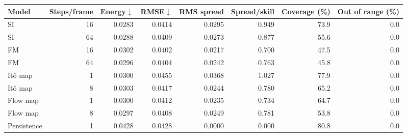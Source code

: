 \begin{tabular}{lrrrrrrr}
\toprule
Model & Steps/frame & Energy$\downarrow$ & RMSE$\downarrow$ & RMS spread & Spread/skill & Coverage (\%) & Out of range (\%) \\
\midrule
SI & 16 & 0.0283 & 0.0414 & 0.0295 & 0.949 & 73.9 & 0.0 \\
SI & 64 & 0.0288 & 0.0409 & 0.0273 & 0.877 & 55.6 & 0.0 \\
FM & 16 & 0.0302 & 0.0402 & 0.0217 & 0.700 & 47.5 & 0.0 \\
FM & 64 & 0.0296 & 0.0404 & 0.0242 & 0.763 & 45.8 & 0.0 \\
It\^o map & 1 & 0.0300 & 0.0455 & 0.0368 & 1.027 & 77.9 & 0.0 \\
It\^o map & 8 & 0.0303 & 0.0417 & 0.0244 & 0.780 & 65.2 & 0.0 \\
Flow map & 1 & 0.0300 & 0.0412 & 0.0235 & 0.734 & 64.7 & 0.0 \\
Flow map & 8 & 0.0297 & 0.0408 & 0.0249 & 0.781 & 53.8 & 0.0 \\
Persistence & 1 & 0.0428 & 0.0428 & 0.0000 & 0.000 & 80.8 & 0.0 \\
\bottomrule
\end{tabular}
